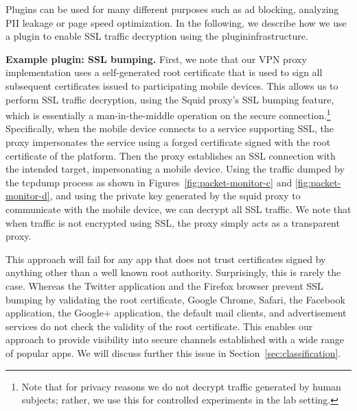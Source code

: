 Plugins can be used for many different purposes such as ad blocking, 
analyzing PII leakage or page speed optimization. In the following, we 
describe how we use a plugin to enable SSL traffic decryption using 
the \platname{} plugininfrastructure. 


\noindent\textbf{Example plugin: SSL bumping.} 
First, we note that our VPN proxy implementation uses a self-generated 
\platname{} root certificate that is used to sign all subsequent certificates 
issued to participating mobile devices. This allows us to perform SSL 
traffic decryption, using the Squid proxy's SSL bumping feature, which is essentially a man-in-the-middle operation 
on the secure connection.\footnote{Note that for privacy reasons we do not 
decrypt traffic generated by human subjects; rather, we use this for controlled 
experiments in the lab setting.} Specifically, when the mobile device connects 
to a service supporting SSL, the proxy impersonates the service using a forged certificate signed
with the root certificate of the \platname{} platform. Then the proxy
establishes an SSL connection with the intended target, impersonating a mobile
device. Using the traffic dumped by the tcpdump process as shown in
Figures~\ref{fig:packet-monitor-c} and \ref{fig:packet-monitor-d}, and
using the private key generated by the squid proxy to communicate with
the mobile device, we can decrypt all SSL traffic. We note that when
traffic is not encrypted using SSL, the proxy simply acts as a
transparent proxy. 

This approach will fail for any app that does not trust certificates 
signed by anything other than a well known root authority. 
Surprisingly, this is rarely the case. Whereas the
Twitter application and the Firefox browser prevent SSL bumping by
validating the root certificate, Google Chrome, Safari, the Facebook
application, the Google+ application, the default mail clients, and
advertisement services do not check the validity of the root
certificate. This enables our approach to provide visibility into 
secure channels established with a wide range of popular apps. We will discuss
further this issue in Section~\ref{sec:classification}. 


